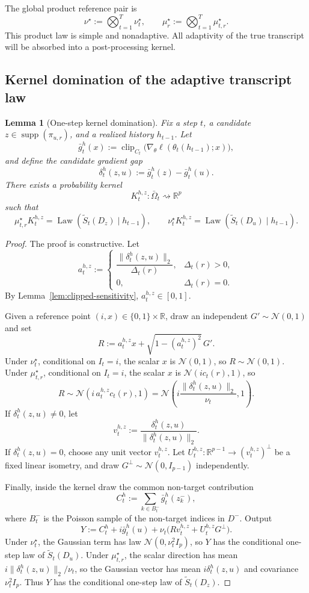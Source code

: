 \documentclass[conference,compsoc]{IEEEtran}
\newtheorem{lemma}{Lemma}
\DeclareMathOperator{\Law}{Law}
\DeclareMathOperator{\clip}{clip}
\DeclareMathOperator{\supp}{supp}
\newcommand{\R}{\mathbb{R}}
\newcommand{\N}{\mathcal{N}}
\begin{document}
The global product reference pair is
\[
\nu^\star:=\bigotimes_{t=1}^T\nu_t^\star,
\qquad
\mu_r^\star:=\bigotimes_{t=1}^T\mu_{t,r}^\star.
\]
This product law is simple and nonadaptive. All adaptivity of the true transcript will be absorbed into a post-processing kernel.

\subsection{Kernel domination of the adaptive transcript law}

\begin{lemma}[One-step kernel domination]
\label{lem:one-step-kernel-domination}
Fix a step $t$, a candidate $z\in\supp(\pi_{u,r})$, and a realized history $h_{t-1}$. Let
\[
\bar g_t^h(x):=\clip_{C_t}\bigl(\nabla_\theta\ell(\theta_t(h_{t-1});x)\bigr),
\]
and define the candidate gradient gap
\[
\delta_t^h(z,u):=\bar g_t^h(z)-\bar g_t^h(u).
\]
There exists a probability kernel
\[
K_t^{h,z}:\bar\Omega_t\rightsquigarrow\R^p
\]
such that
\[
\mu_{t,r}^\star K_t^{h,z}=\Law(\widetilde S_t(D_z)\mid h_{t-1}),
\qquad
\nu_t^\star K_t^{h,z}=\Law(\widetilde S_t(D_u)\mid h_{t-1}).
\]
\end{lemma}

\begin{proof}
The proof is constructive. Let
\[
a_t^{h,z}:=
\begin{cases}
\dfrac{\|\delta_t^h(z,u)\|_2}{\Delta_t(r)}, & \Delta_t(r)>0,\\[1.0ex]
0, & \Delta_t(r)=0.
\end{cases}
\]
By Lemma~\ref{lem:clipped-sensitivity}, $a_t^{h,z}\in[0,1]$.

Given a reference point $(i,x)\in\{0,1\}\times\R$, draw an independent $G'\sim\N(0,1)$ and set
\[
R:=a_t^{h,z}x+\sqrt{1-(a_t^{h,z})^2}\,G'.
\]
Under $\nu_t^\star$, conditional on $I_t=i$, the scalar $x$ is $\N(0,1)$, so $R\sim\N(0,1)$. Under $\mu_{t,r}^\star$, conditional on $I_t=i$, the scalar $x$ is $\N(i c_t(r),1)$, so
\[
R\sim\N\left(i\,a_t^{h,z}c_t(r),1\right)
=\N\left(i\frac{\|\delta_t^h(z,u)\|_2}{\nu_t},1\right).
\]
If $\delta_t^h(z,u)\ne0$, let
\[
v_t^{h,z}:=\frac{\delta_t^h(z,u)}{\|\delta_t^h(z,u)\|_2}.
\]
If $\delta_t^h(z,u)=0$, choose any unit vector $v_t^{h,z}$. Let $U_t^{h,z}:\R^{p-1}\to (v_t^{h,z})^\perp$ be a fixed linear isometry, and draw $G^\perp\sim\N(0,I_{p-1})$ independently.

Finally, inside the kernel draw the common non-target contribution
\[
C_t^h:=\sum_{k\in B_t^-}\bar g_t^h(z_k^-),
\]
where $B_t^-$ is the Poisson sample of the non-target indices in $D^-$. Output
\[
Y:=C_t^h+i\bar g_t^h(u)+\nu_t\bigl(Rv_t^{h,z}+U_t^{h,z}G^\perp\bigr).
\]
Under $\nu_t^\star$, the Gaussian term has law $\N(0,\nu_t^2 I_p)$, so $Y$ has the conditional one-step law of $\widetilde S_t(D_u)$. Under $\mu_{t,r}^\star$, the scalar direction has mean $i\|\delta_t^h(z,u)\|_2/\nu_t$, so the Gaussian vector has mean $i\delta_t^h(z,u)$ and covariance $\nu_t^2 I_p$. Thus $Y$ has the conditional one-step law of $\widetilde S_t(D_z)$.
\end{proof}
\end{document}
